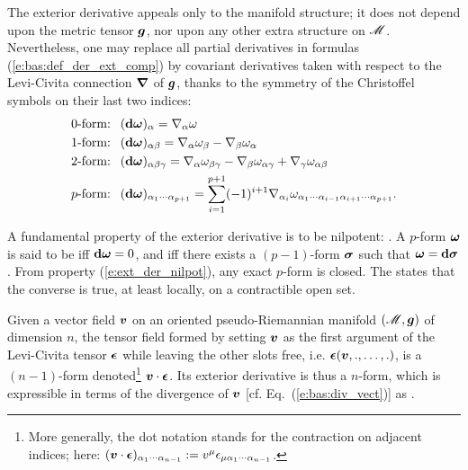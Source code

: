 \begin{remark}
The exterior derivative appeals only to the
manifold structure; it does not depend upon the metric tensor $\bm{g}$, nor upon
any other extra structure on $\mathscr{M}$.
Nevertheless, one may replace
all partial derivatives in formulas (\ref{e:bas:def_der_ext_comp})
by covariant derivatives taken with respect to the Levi-Civita connection $\bm{\nabla}$
of $\bm{g}$,
thanks to the symmetry of the Christoffel symbols on their last two indices:
\begin{subequations}
\begin{align}
    \mbox{0-form: \ } & (\mathbf{d}\bm{\omega})_\alpha =
        \nabla_\alpha \omega \label{e:bas:def_ext_0f_nab} \\
    \mbox{1-form: \ } & (\mathbf{d}\bm{\omega})_{\alpha\beta} =
        \nabla_\alpha \omega_\beta - \nabla_\beta \omega_\alpha
            \label{e:bas:def_ext_1f_nab} \\
    \mbox{2-form: \ } & (\mathbf{d}\bm{\omega})_{\alpha\beta\gamma} =
    \nabla_\alpha\omega_{\beta\gamma} -
    \nabla_\beta\omega_{\alpha\gamma} +
    \nabla_\gamma\omega_{\alpha\beta} \label{e:bas:def_ext_2f_nab} \\
         \mbox{$p$-form: \ }  &
     (\mathbf{d}\bm{\omega})_{\alpha_1\cdots\alpha_{p+1}} =
     \sum_{i=1}^{p+1} (-1)^{i+1} \nabla_{\alpha_i}
     \omega_{\alpha_1\cdots\alpha_{i-1}\alpha_{i+1}\cdots\alpha_{p+1}} .
\end{align}
\end{subequations}
\end{remark}

A fundamental property of the exterior derivative is to be nilpotent:
\be \label{e:ext_der_nilpot}
    .
\ee
A $p$-form $\bm{\omega}$ is said to be  iff $\mathbf{d}\bm{\omega}=0$,
and  iff there exists a $(p-1)$-form $\bm{\sigma}$ such that
$\bm{\omega} = \mathbf{d}\bm{\sigma}$. From property (\ref{e:ext_der_nilpot}),
any exact $p$-form is closed. The  states that the converse is true,
at least locally, on a contractible open set.

Given a vector field $\bm{v}$ on an oriented pseudo-Riemannian manifold $(\mathscr{M},\bm{g})$ of dimension $n$,
the tensor field formed by setting $\bm{v}$ as the first argument of the
Levi-Civita tensor $\bm{\epsilon}$ while leaving the other slots free, i.e. $\bm{\epsilon}(\bm{v},.,\ldots,.)$,
is a $(n-1)$-form
denoted\footnote{More generally, the dot notation stands for the contraction on adjacent indices; here: $(\bm{v}\cdot\bm{\epsilon})_{\alpha_1\cdots\alpha_{n-1}} := v^\mu \epsilon_{\mu\alpha_1\cdots\alpha_{n-1}}$.}
$\bm{v}\cdot\bm{\epsilon}$. Its exterior
derivative is thus a $n$-form, which is expressible in terms of the divergence
of $\bm{v}$ [cf. Eq.~(\ref{e:bas:div_vect})] as
\be \label{e:bas:dveps_divv}
    .
\ee

